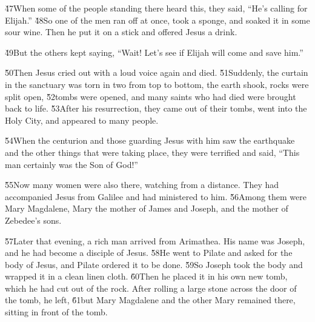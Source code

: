 \v{47}When some of the people standing there heard this, they said, ``He's calling for Elijah.'' \v{48}So one of the men ran off at once, took a sponge, and soaked it in some sour wine. Then he put it on a stick and offered Jesus a drink.

\v{49}But the others kept saying, ``Wait! Let's see if Elijah will come and save him.''

\v{50}Then Jesus cried out with a loud voice again and died. \v{51}Suddenly, the curtain in the sanctuary was torn in two from top to bottom, the earth shook, rocks were split open, \v{52}tombs were opened, and many saints who had died were brought back to life. \v{53}After his resurrection, they came out of their tombs, went into the Holy City, and appeared to many people.

\v{54}When the centurion and those guarding Jesus with him saw the earthquake and the other things that were taking place, they were terrified and said, ``This man certainly was the Son of God!''

\v{55}Now many women were also there, watching from a distance. They had accompanied Jesus from Galilee and had ministered to him. \v{56}Among them were Mary Magdalene, Mary the mother of James and Joseph, and the mother of Zebedee's sons.

\v{57}Later that evening, a rich man arrived from Arimathea. His name was Joseph, and he had become a disciple of Jesus. \v{58}He went to Pilate and asked for the body of Jesus, and Pilate ordered it to be done. \v{59}So Joseph took the body and wrapped it in a clean linen cloth. \v{60}Then he placed it in his own new tomb, which he had cut out of the rock. After rolling a large stone across the door of the tomb, he left, \v{61}but Mary Magdalene and the other Mary remained there, sitting in front of the tomb.

